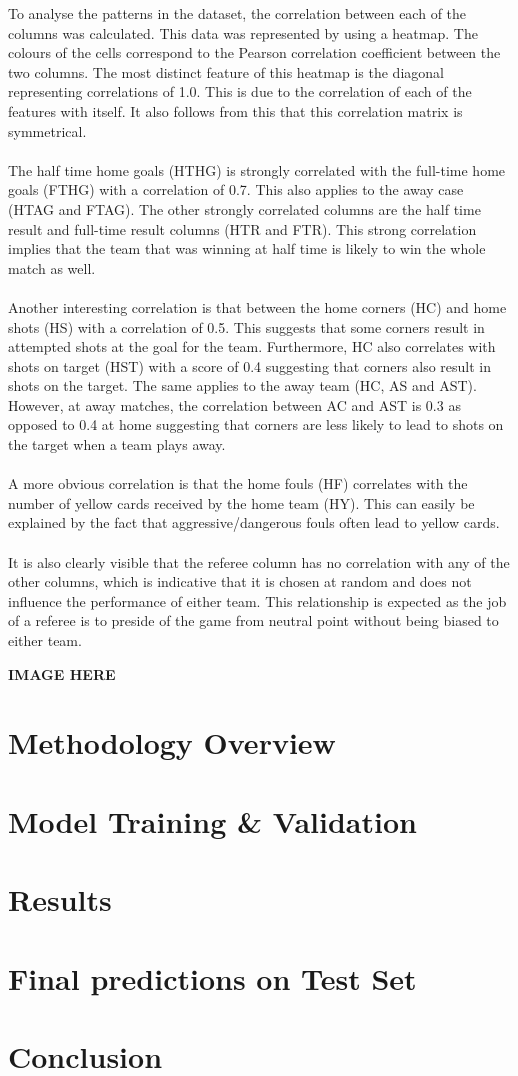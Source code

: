 \documentclass[a4paper,12pt]{article}
\begin{document}
		To analyse the patterns in the dataset, the correlation between each of the columns was calculated. This data was represented by using a heatmap. The colours of the cells correspond to the Pearson correlation coefficient between the two columns. The most distinct feature of this heatmap is the diagonal representing correlations of 1.0. This is due to the correlation of each of the features with itself. It also follows from this that this correlation matrix is symmetrical.\\
		\\
		The half time home goals (HTHG) is strongly correlated with the full-time home goals (FTHG) with a correlation of 0.7. This also applies to the away case (HTAG and FTAG). The other strongly correlated columns are the half time result and full-time result columns (HTR and FTR). This strong correlation implies that the team that was winning at half time is likely to win the whole match as well.\\
		\\
		Another interesting correlation is that between the home corners (HC) and home shots (HS) with a correlation of 0.5. This suggests that some corners result in attempted shots at the goal for the team. Furthermore, HC also correlates with shots on target (HST) with a score of 0.4 suggesting that corners also result in shots on the target. The same applies to the away team (HC, AS and AST). However, at away matches, the correlation between AC and AST is 0.3 as opposed to 0.4 at home suggesting that corners are less likely to lead to shots on the target when a team plays away.\\
		\\
		A more obvious correlation is that the home fouls (HF) correlates with the number of yellow cards received by the home team (HY). This can easily be explained by the fact that aggressive/dangerous fouls often lead to yellow cards.\\
		\\
		It is also clearly visible that the referee column has no correlation with any of the other columns, which is indicative that it is chosen at random and does not influence the performance of either team. This relationship is expected as the job of a referee is to preside of the game from neutral point without being biased to either team.
		
		\textbf{IMAGE HERE}
	
\section{Methodology Overview}

\section{Model Training \& Validation}

\section{Results}

\section{Final predictions on Test Set}

\section{Conclusion}
\end{document}

